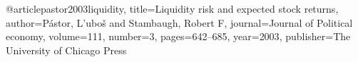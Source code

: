 @article{pastor2003liquidity,
  title={Liquidity risk and expected stock returns},
  author={P{\'a}stor, L'ubo{\v{s}} and Stambaugh, Robert F},
  journal={Journal of Political economy},
  volume={111},
  number={3},
  pages={642--685},
  year={2003},
  publisher={The University of Chicago Press}
}